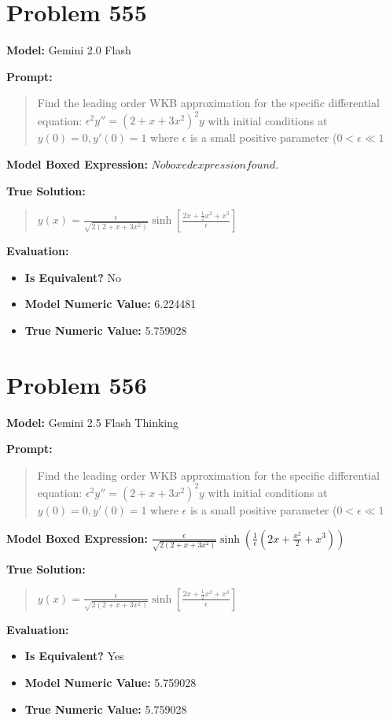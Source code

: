 \documentclass{article}
\begin{document}
\section*{Problem 555}
\textbf{Model:} Gemini 2.0 Flash

\textbf{Prompt:}
\begin{quote}
Find the leading order WKB approximation for the specific differential equation: $\epsilon^2 y'' = (2+x+3x^2)^2y$ with initial conditions at $y(0) = 0, y'(0)=1$ where $\epsilon$ is a small positive parameter ($0 < \epsilon \ll 1$
\end{quote}
\textbf{Model Boxed Expression:} $No boxed expression found.$

\textbf{True Solution:}
\begin{quote}
$y(x) = \frac{\epsilon}{\sqrt{2(2+x+3x^2)}} \sinh[\frac{2x+\frac{1}{2}x^2+x^3}{\epsilon}]$
\end{quote}

\textbf{Evaluation:}
\begin{itemize}
\item \textbf{Is Equivalent?} No
\item \textbf{Model Numeric Value:} 6.224481
\item \textbf{True Numeric Value:} 5.759028
\end{itemize}
\vspace{1cm}
\section*{Problem 556}
\textbf{Model:} Gemini 2.5 Flash Thinking

\textbf{Prompt:}
\begin{quote}
Find the leading order WKB approximation for the specific differential equation: $\epsilon^2 y'' = (2+x+3x^2)^2y$ with initial conditions at $y(0) = 0, y'(0)=1$ where $\epsilon$ is a small positive parameter ($0 < \epsilon \ll 1$
\end{quote}
\textbf{Model Boxed Expression:} $\frac{\epsilon}{\sqrt{2(2+x+3x^2)}} \sinh\left(\frac{1}{\epsilon}\left(2x+\frac{x^2}{2}+x^3\right)\right)$

\textbf{True Solution:}
\begin{quote}
$y(x) = \frac{\epsilon}{\sqrt{2(2+x+3x^2)}} \sinh[\frac{2x+\frac{1}{2}x^2+x^3}{\epsilon}]$
\end{quote}

\textbf{Evaluation:}
\begin{itemize}
\item \textbf{Is Equivalent?} Yes
\item \textbf{Model Numeric Value:} 5.759028
\item \textbf{True Numeric Value:} 5.759028
\end{itemize}
\vspace{1cm}
\end{document}
